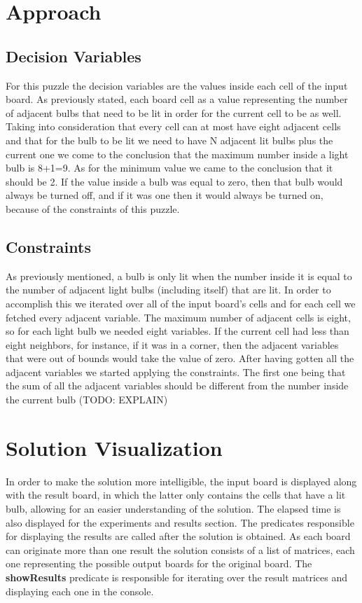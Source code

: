 \documentclass[runningheads]{llncs}
\begin{document}
\section{Approach}

\subsection{Decision Variables}
For this puzzle the decision variables are the values inside each cell of the input board. As previously stated, each board cell as a value representing the number of adjacent bulbs that need to be lit in order for the current cell to be as well.
Taking into consideration that every cell can at most have eight adjacent cells and that for the bulb to be lit we need to have N adjacent lit bulbs plus the current one we come to the conclusion that the maximum number inside a light bulb is 8+1=9. As for the minimum value we came to the conclusion that it should be 2. If the value inside a bulb was equal to zero, then that bulb would always be turned off, and if it was one then it would always be turned on, because of the constraints of this puzzle.

\subsection{Constraints}
As previously mentioned, a bulb is only lit when the number inside it is equal to the number of adjacent light bulbs (including itself) that are lit. In order to accomplish this we iterated over all of the input board's cells and for each cell we fetched every adjacent variable. The maximum number of adjacent cells is eight, so for each light bulb we needed eight variables. If the current cell had less than eight neighbors, for instance, if it was in a corner, then the adjacent variables that were out of bounds would take the value of zero.
After having gotten all the adjacent variables we started applying the constraints. The first one being that the sum of all the adjacent variables should be different from the number inside the current bulb 
(TODO: EXPLAIN)

\section{Solution Visualization}
In order to make the solution more intelligible, the input board is displayed along with the result board, in which the latter
only contains the cells that have a lit bulb, allowing for an easier understanding of the solution. The elapsed time is also displayed for the experiments and results section.
The predicates responsible for displaying the results are called after the solution is obtained. As each board can originate more than one result the solution consists of a list of matrices, each one representing the possible output boards for the original board. The \textbf{showResults} predicate is responsible for iterating over the result matrices and displaying each one in the console.
\end{document}
